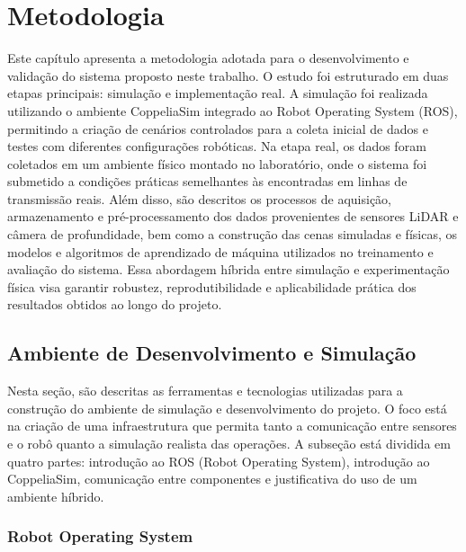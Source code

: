 
\chapter{Metodologia}
\label{cap:trabalhos:metodologia}

Este capítulo apresenta a metodologia adotada para o desenvolvimento e validação do sistema proposto neste trabalho. O estudo foi estruturado em duas etapas principais: simulação e implementação real. A simulação foi realizada utilizando o ambiente CoppeliaSim integrado ao Robot Operating System (ROS), permitindo a criação de cenários controlados para a coleta inicial de dados e testes com diferentes configurações robóticas. Na etapa real, os dados foram coletados em um ambiente físico montado no laboratório, onde o sistema foi submetido a condições práticas semelhantes às encontradas em linhas de transmissão reais. Além disso, são descritos os processos de aquisição, armazenamento e pré-processamento dos dados provenientes de sensores LiDAR e câmera de profundidade, bem como a construção das cenas simuladas e físicas, os modelos e algoritmos de aprendizado de máquina utilizados no treinamento e avaliação do sistema. Essa abordagem híbrida entre simulação e experimentação física visa garantir robustez, reprodutibilidade e aplicabilidade prática dos resultados obtidos ao longo do projeto.

\section{Ambiente de Desenvolvimento e Simulação}

Nesta seção, são descritas as ferramentas e tecnologias utilizadas para a construção do ambiente de simulação e desenvolvimento do projeto. O foco está na criação de uma infraestrutura que permita tanto a comunicação entre sensores e o robô quanto a simulação realista das operações. A subseção está dividida em quatro partes: introdução ao ROS (Robot Operating System), introdução ao CoppeliaSim, comunicação entre componentes e justificativa do uso de um ambiente híbrido.


\subsection{Robot Operating System}

